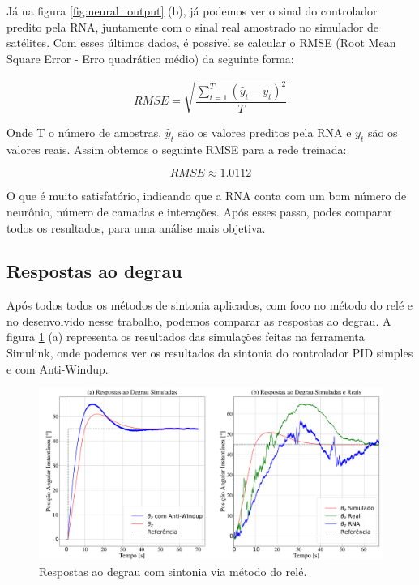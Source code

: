 Já na figura \ref{fig:neural_output} (b), já podemos ver o sinal do controlador predito pela RNA, juntamente com o sinal real amostrado no simulador de satélites. Com esses últimos dados, é possível se calcular o RMSE (Root Mean Square Error - Erro quadrático médio) da seguinte forma:

\begin{equation}
RMSE = \sqrt{\frac{\sum_{t=1}^{T}(\hat{y}_t-y_t)^2}{T}}
\end{equation}

Onde T o número de amostras, $\hat{y}_t$ são os valores preditos pela RNA e $y_t$ são os valores reais. Assim obtemos o seguinte RMSE para a rede treinada:

\begin{equation}
RMSE \approx 1.0112
\end{equation}

O que é muito satisfatório, indicando que a RNA conta com um bom número de neurônio, número de camadas e interações. Após esses passo, podes comparar todos os resultados, para uma análise mais objetiva. 



\subsection{Respostas ao degrau}

Após todos todos os métodos de sintonia aplicados, com foco no método do relé e no desenvolvido nesse trabalho, podemos comparar as respostas ao degrau. A figura \ref{fig:pid_result} (a) representa os resultados das simulações feitas na ferramenta Simulink, onde podemos ver os resultados da sintonia do controlador PID simples e com Anti-Windup.

\begin{figure}[H]
  \caption{Respostas ao degrau com sintonia via método do relé.}
  \begin{center}
      \includegraphics[scale=0.25]{resultados/img/pid_result}
  \end{center}
  \label{fig:pid_result}
\end{figure}

